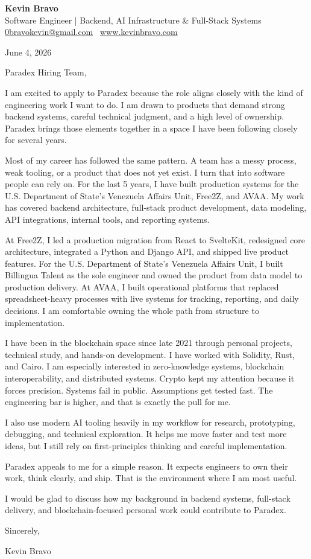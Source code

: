 \documentclass[11pt]{article}
\begin{document}
\begin{center}
    {\LARGE \textbf{Kevin Bravo}}\\
    Software Engineer | Backend, AI Infrastructure \& Full-Stack Systems \\
    \href{mailto:0bravokevin@gmail.com}{0bravokevin@gmail.com} \textbullet\ 
    \href{http://www.kevinbravo.com}{www.kevinbravo.com}
\end{center}

\vspace{0.5em}

June 4, 2026

Paradex Hiring Team,

I am excited to apply to Paradex because the role aligns closely with the kind of engineering work I want to do. I am drawn to products that demand strong backend systems, careful technical judgment, and a high level of ownership. Paradex brings those elements together in a space I have been following closely for several years.

Most of my career has followed the same pattern. A team has a messy process, weak tooling, or a product that does not yet exist. I turn that into software people can rely on. For the last 5 years, I have built production systems for the U.S. Department of State's Venezuela Affairs Unit, Free2Z, and AVAA. My work has covered backend architecture, full-stack product development, data modeling, API integrations, internal tools, and reporting systems.

At Free2Z, I led a production migration from React to SvelteKit, redesigned core architecture, integrated a Python and Django API, and shipped live product features. For the U.S. Department of State's Venezuela Affairs Unit, I built Billingua Talent as the sole engineer and owned the product from data model to production delivery. At AVAA, I built operational platforms that replaced spreadsheet-heavy processes with live systems for tracking, reporting, and daily decisions. I am comfortable owning the whole path from structure to implementation.

I have been in the blockchain space since late 2021 through personal projects, technical study, and hands-on development. I have worked with Solidity, Rust, and Cairo. I am especially interested in zero-knowledge systems, blockchain interoperability, and distributed systems. Crypto kept my attention because it forces precision. Systems fail in public. Assumptions get tested fast. The engineering bar is higher, and that is exactly the pull for me.

I also use modern AI tooling heavily in my workflow for research, prototyping, debugging, and technical exploration. It helps me move faster and test more ideas, but I still rely on first-principles thinking and careful implementation.

Paradex appeals to me for a simple reason. It expects engineers to own their work, think clearly, and ship. That is the environment where I am most useful.

I would be glad to discuss how my background in backend systems, full-stack delivery, and blockchain-focused personal work could contribute to Paradex.

Sincerely,

Kevin Bravo
\end{document}

